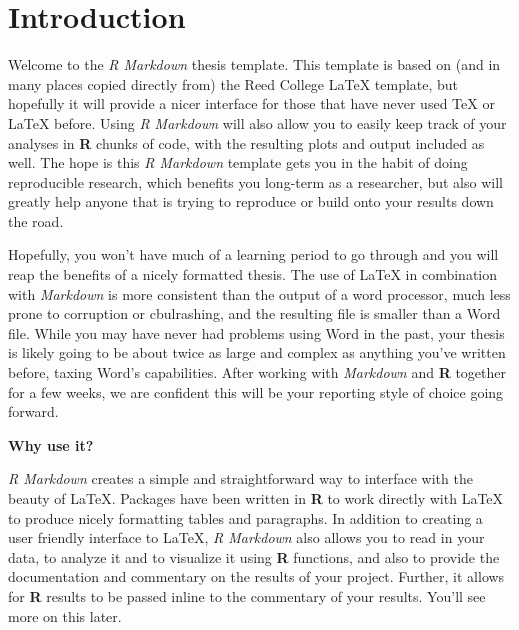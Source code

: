 \documentclass[12pt,twoside]{deuthesis}
\begin{document}
  \hypersetup{linkcolor=black}
  \setcounter{tocdepth}{2}
  \tableofcontents

  \listoftables

  \listoffigures


\newlength{\cslhangindent}
\setlength{\cslhangindent}{1.5em}
\newenvironment{CSLReferences}%
  {}%
  {\par}
\newenvironment{cslreferences}%
  {}%
  {\par}

\mainmatter %
\pagestyle{fancyplain} %


\hypertarget{introduction}{%
\chapter*{Introduction}\label{introduction}}

Welcome to the \emph{R Markdown} thesis template. This template is based on (and in many places copied directly from) the Reed College LaTeX template, but hopefully it will provide a nicer interface for those that have never used TeX or LaTeX before. Using \emph{R Markdown} will also allow you to easily keep track of your analyses in \textbf{R} chunks of code, with the resulting plots and output included as well. The hope is this \emph{R Markdown} template gets you in the habit of doing reproducible research, which benefits you long-term as a researcher, but also will greatly help anyone that is trying to reproduce or build onto your results down the road.

Hopefully, you won't have much of a learning period to go through and you will reap the benefits of a nicely formatted thesis. The use of LaTeX in combination with \emph{Markdown} is more consistent than the output of a word processor, much less prone to corruption or cbulrashing, and the resulting file is smaller than a Word file. While you may have never had problems using Word in the past, your thesis is likely going to be about twice as large and complex as anything you've written before, taxing Word's capabilities. After working with \emph{Markdown} and \textbf{R} together for a few weeks, we are confident this will be your reporting style of choice going forward.

\textbf{Why use it?}

\emph{R Markdown} creates a simple and straightforward way to interface with the beauty of LaTeX. Packages have been written in \textbf{R} to work directly with LaTeX to produce nicely formatting tables and paragraphs. In addition to creating a user friendly interface to LaTeX, \emph{R Markdown} also allows you to read in your data, to analyze it and to visualize it using \textbf{R} functions, and also to provide the documentation and commentary on the results of your project. Further, it allows for \textbf{R} results to be passed inline to the commentary of your results. You'll see more on this later.
\end{document}
